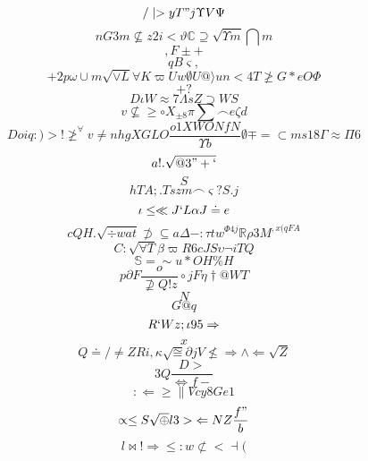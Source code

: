 \documentclass[12pt]{article}
\begin{document}
        \begin{minipage}[t][0pt]{\linewidth}

        \[/\mid > y T " j\Upsilon V\Psi\]
\[nG3m\nsubseteq z 2 i <\vartheta\mathbb{C}\supseteq\sqrt{\Upsilon m}\bigcap m\]
\[,F\pm +\]
\[qB\varsigma ,\]
\[+2p\omega\cup m\sqrt{\lor L}\forall K\varpi U w\emptyset U @\rangle u n < 4 T\ngeq G * e O\Phi\]
\[+?\]
\[D\iota W\approx 7\Lambda s Z\supset W S\]
\[v\nsubseteq\geq\circ X_{\pm 8}\pi\sum\frown e\zeta d\]
\[Doiq:)>!\ngeq^{\forall} v\neq n h g X G L O\frac{o1XWONfN}{\Upsilon b}\emptyset\mp =\subset m s 1 8\Gamma\approx\Pi 6\]
\[a!.\sqrt{@3"+`}\]
\[S\]
\[hTA;.Tszm\frown\varsigma ? S . j\]
\[\iota\leq\ll J ` L\alpha J\doteq e\]
\[cQH.\sqrt{\div w a t}\not\supset\subseteq a\Delta - :\tau t w^{\Phi 4 j}\mathbb{R}\rho 3 M^{,x(qFA}\]
\[C:\sqrt{\forall T}\beta\varpi R 6 c J S\upsilon\neg i T Q\]
\[\mathbb{S} =\sim u * O H\% H\]
\[p\partial F\frac{o}{\nsupseteq Q ! z}\circ j F\eta\dagger @ W T\]
\[N\]
\[G@q\]
\[R`Wz;\iota 9 5\Rightarrow\]
\[x\]
\[Q\doteq /\neq Z R i ,\kappa\sqrt{\cong}\partial j V\nleq\Rightarrow\land\Leftarrow\sqrt{Z}\]
\[3Q\frac{D>}{\Leftrightarrow f -}\]
\[:\Longleftarrow\geq\parallel V c y 8 G e 1\]
\[\propto\leq S\sqrt{\oplus} l {3>}\Leftarrow N Z\frac{f"}{b}\]
\[l\bowtie !\Longrightarrow\leq : w\not\subset <\dashv (
        \]
\end{minipage}
\end{document}
